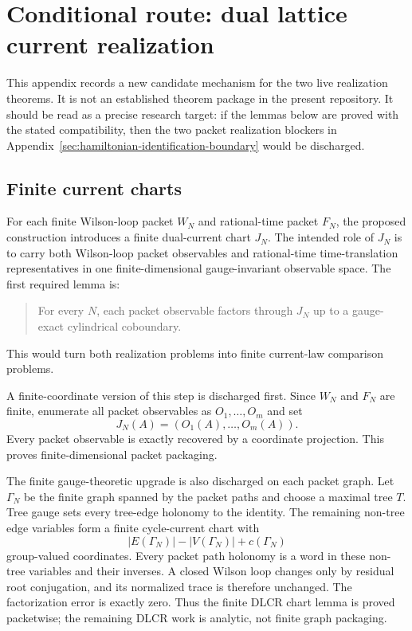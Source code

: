 \section{Conditional route: dual lattice current realization}
\label{app:dlcr_conditional}

This appendix records a new candidate mechanism for the two live realization
theorems. It is not an established theorem package in the present repository.
It should be read as a precise research target: if the lemmas below are proved
with the stated compatibility, then the two packet realization blockers in
Appendix~\ref{sec:hamiltonian-identification-boundary} would be discharged.

\subsection{Finite current charts}
For each finite Wilson-loop packet $W_N$ and rational-time packet $F_N$, the
proposed construction introduces a finite dual-current chart $J_N$. The intended
role of $J_N$ is to carry both Wilson-loop packet observables and rational-time
time-translation representatives in one finite-dimensional gauge-invariant
observable space. The first required lemma is:
\begin{quote}
For every $N$, each packet observable factors through $J_N$ up to a gauge-exact
cylindrical coboundary.
\end{quote}
This would turn both realization problems into finite current-law comparison
problems.

A finite-coordinate version of this step is discharged first. Since $W_N$ and
$F_N$ are finite, enumerate all packet observables as $O_1,\ldots,O_m$ and set
\[
  J_N(A)=(O_1(A),\ldots,O_m(A)).
\]
Every packet observable is exactly recovered by a coordinate projection. This
proves finite-dimensional packet packaging.

The finite gauge-theoretic upgrade is also discharged on each packet graph.
Let $\Gamma_N$ be the finite graph spanned by the packet paths and choose a
maximal tree $T$. Tree gauge sets every tree-edge holonomy to the identity.
The remaining non-tree edge variables form a finite cycle-current chart with
\[
  |E(\Gamma_N)|-|V(\Gamma_N)|+c(\Gamma_N)
\]
group-valued coordinates. Every packet path holonomy is a word in these
non-tree variables and their inverses. A closed Wilson loop changes only by
residual root conjugation, and its normalized trace is therefore unchanged. The
factorization error is exactly zero. Thus the finite DLCR chart lemma is proved
packetwise; the remaining DLCR work is analytic, not finite graph packaging.

